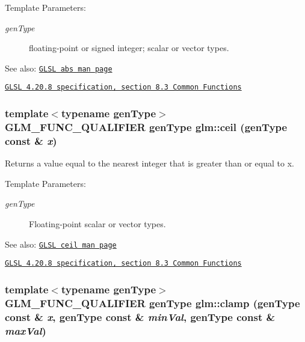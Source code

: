 \begin{Desc}
\item[Template Parameters:]
\begin{description}
\item[{\em genType}]floating-point or signed integer; scalar or vector types.\end{description}
\end{Desc}
\begin{Desc}
\item[See also:]\href{http://www.opengl.org/sdk/docs/manglsl/xhtml/abs.xml}{\tt GLSL abs man page} 

\href{http://www.opengl.org/registry/doc/GLSLangSpec.4.20.8.pdf}{\tt GLSL 4.20.8 specification, section 8.3 Common Functions} \end{Desc}
\hypertarget{group__core__func__common_g18be34b68c7f647b4455bafe4c7d7ecd}{
\subsubsection[ceil]{\setlength{\rightskip}{0pt plus 5cm}template$<$typename genType$>$ GLM\_\-FUNC\_\-QUALIFIER genType glm::ceil (genType const \& {\em x})}}
\label{group__core__func__common_g18be34b68c7f647b4455bafe4c7d7ecd}


Returns a value equal to the nearest integer that is greater than or equal to x.

\begin{Desc}
\item[Template Parameters:]
\begin{description}
\item[{\em genType}]Floating-point scalar or vector types.\end{description}
\end{Desc}
\begin{Desc}
\item[See also:]\href{http://www.opengl.org/sdk/docs/manglsl/xhtml/ceil.xml}{\tt GLSL ceil man page} 

\href{http://www.opengl.org/registry/doc/GLSLangSpec.4.20.8.pdf}{\tt GLSL 4.20.8 specification, section 8.3 Common Functions} \end{Desc}
\hypertarget{group__core__func__common_g8b4808983e20c4c74b20e0a025787ab4}{
\subsubsection[clamp]{\setlength{\rightskip}{0pt plus 5cm}template$<$typename genType$>$ GLM\_\-FUNC\_\-QUALIFIER genType glm::clamp (genType const \& {\em x}, \/  genType const \& {\em minVal}, \/  genType const \& {\em maxVal})}}
\label{group__core__func__common_g8b4808983e20c4c74b20e0a025787ab4}


